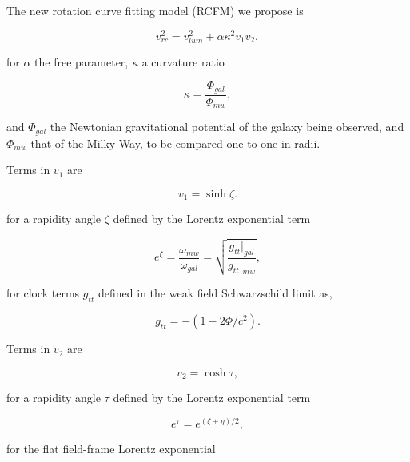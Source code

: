 \documentclass[reprint,%
 amsmath,amssymb,
 aps,
]{revtex4-1}
\begin{document}
   The new rotation curve fitting model (RCFM) we propose  is
   

\begin{equation}
v_{rc}^2 =  v_{lum}^2+\alpha \kappa^2 v_{1} v_{2},  
\label{eq:zonteLCM}
\end{equation}  

for $\alpha$  the free parameter,  
$\kappa$  a curvature ratio 

 \begin{equation}
\kappa=\frac{\Phi_{gal}}{\Phi_{mw}}, 
\label{eq:kappa2}  
\end{equation}  

 and $\Phi_{gal}$ the    Newtonian gravitational potential of the galaxy being observed, and $\Phi_{mw}$ that of  the Milky Way, to be compared one-to-one in radii. 


 Terms in $v_1$   are   
 
   \begin{equation}
       v_1 = \sinh \zeta. 
       \label{eq:hyperbolica}
   \end{equation}
 
 for a rapidity angle $\zeta$ defined by the    Lorentz exponential  term  
  
   
     \begin{equation}
     e^{\zeta}=  \frac{\omega_{mw}}{\omega_{gal}}  =\sqrt{\frac{g_{tt}|_{gal}}{g_{tt}|_{mw}}},
      \label{eq:gravRS}
    \end{equation}
    
 for  clock terms $g_{tt}$   defined in the   weak field Schwarzschild limit  \cite{Hartle} as, 
 
  \begin{equation}
      g_{tt}= -( 1 - 2\Phi/ c^2).
      \label{clocktime}
  \end{equation} 
  

Terms in $v_2$ are 

\begin{equation}
v_{2} =  \cosh \tau, 
\label{eq:hyperbolico}
\end{equation}


 
 
  for a rapidity angle $\tau$ defined by the    Lorentz exponential  term  
  
 
\begin{equation}
    e^{\tau}=   e^{(\zeta+\eta)/2},
\end{equation}
 
for the  flat field-frame
Lorentz exponential  
\end{document}
